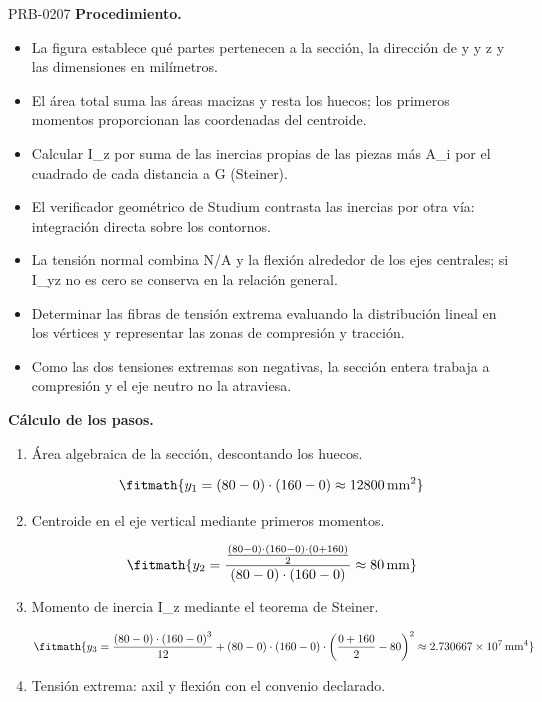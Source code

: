 \begin{studiumworked}{PRB-0207}
\textbf{Procedimiento.}\begin{itemize}\item La figura establece qué partes pertenecen a la sección, la dirección de y y z y las dimensiones en milímetros.
\item El área total suma las áreas macizas y resta los huecos; los primeros momentos proporcionan las coordenadas del centroide.
\item Calcular I\_z por suma de las inercias propias de las piezas más A\_i por el cuadrado de cada distancia a G (Steiner).
\item El verificador geométrico de Studium contrasta las inercias por otra vía: integración directa sobre los contornos.
\item La tensión normal combina N/A y la flexión alrededor de los ejes centrales; si I\_yz no es cero se conserva en la relación general.
\item Determinar las fibras de tensión extrema evaluando la distribución lineal en los vértices y representar las zonas de compresión y tracción.
\item Como las dos tensiones extremas son negativas, la sección entera trabaja a compresión y el eje neutro no la atraviesa.\end{itemize}

\textbf{Cálculo de los pasos.}

\begin{enumerate}

\item Área algebraica de la sección, descontando los huecos.

\[\fitmath{y_{1}=\left(80-0\right)\cdot \left(160-0\right)\approx 12800\,\mathrm{mm^{2}}}\]

\item Centroide en el eje vertical mediante primeros momentos.

\[\fitmath{y_{2}=\frac{\frac{\left(80-0\right)\cdot \left(160-0\right)\cdot \left(0+160\right)}{2}}{\left(80-0\right)\cdot \left(160-0\right)}\approx 80\,\mathrm{mm}}\]

\item Momento de inercia I\_z mediante el teorema de Steiner.

\[\fitmath{y_{3}=\frac{\left(80-0\right)\cdot {\left(160-0\right)}^{3}}{12}+\left(80-0\right)\cdot \left(160-0\right)\cdot {\left(\frac{0+160}{2}-80\right)}^{2}\approx 2.730667\times10^{7}\,\mathrm{mm^{4}}}\]

\item Tensión extrema: axil y flexión con el convenio declarado.


\end{enumerate}
\end{studiumworked}
